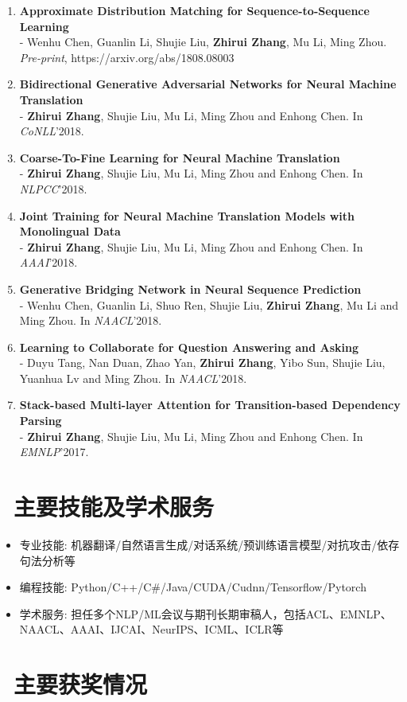 \documentclass{resume}
\begin{document}
\begin{enumerate}
\item \normalsize \textbf{Approximate Distribution Matching for Sequence-to-Sequence Learning} \\
\small - Wenhu Chen, Guanlin Li, Shujie Liu, \textbf{Zhirui Zhang}, Mu Li, Ming Zhou. \textit{Pre-print}, https://arxiv.org/abs/1808.08003

\item \normalsize \textbf{Bidirectional Generative Adversarial Networks for Neural Machine Translation} \\
\small - \textbf{Zhirui Zhang}, Shujie Liu, Mu Li, Ming Zhou and Enhong Chen. In \textit{CoNLL}'2018.

\item \normalsize \textbf{Coarse-To-Fine Learning for Neural Machine Translation} \\
\small - \textbf{Zhirui Zhang}, Shujie Liu, Mu Li, Ming Zhou and Enhong Chen. In \textit{NLPCC}'2018.

\item \normalsize \textbf{Joint Training for Neural Machine Translation Models with Monolingual Data} \\
\small - \textbf{Zhirui Zhang}, Shujie Liu, Mu Li, Ming Zhou and Enhong Chen. In \textit{AAAI}'2018.

\item \normalsize \textbf{Generative Bridging Network in Neural Sequence Prediction} \\
\small - Wenhu Chen, Guanlin Li, Shuo Ren, Shujie Liu, \textbf{Zhirui Zhang}, Mu Li and Ming Zhou. In \textit{NAACL}'2018.

\item \normalsize \textbf{Learning to Collaborate for Question Answering and Asking} \\
\small - Duyu Tang, Nan Duan, Zhao Yan, \textbf{Zhirui Zhang}, Yibo Sun, Shujie Liu, Yuanhua Lv and Ming Zhou. In \textit{NAACL}'2018.

\item \normalsize \textbf{Stack-based Multi-layer Attention for Transition-based Dependency Parsing} \\
\small - \textbf{Zhirui Zhang}, Shujie Liu, Mu Li, Ming Zhou and Enhong Chen. In \textit{EMNLP}'2017.

\end{enumerate}

\section{\faCogs\ 主要技能及学术服务}
\begin{itemize}
  \item 专业技能: 机器翻译/自然语言生成/对话系统/预训练语言模型/对抗攻击/依存句法分析等
  \item 编程技能: Python/C++/C\#/Java/CUDA/Cudnn/Tensorflow/Pytorch
  \item 学术服务: 担任多个NLP/ML会议与期刊长期审稿人，包括ACL、EMNLP、NAACL、AAAI、IJCAI、NeurIPS、ICML、ICLR等
\end{itemize}

\section{\faHeartO\ 主要获奖情况}

%
%
\end{document}
